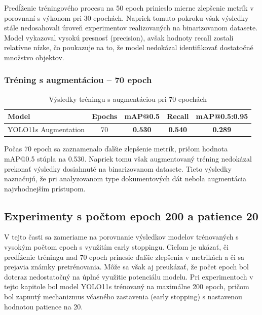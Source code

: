             Predĺženie tréningového procesu na 50 epoch prinieslo mierne zlepšenie metrík v porovnaní s výkonom pri 30 epochách. Napriek tomuto pokroku však výsledky stále nedosahovali úroveň experimentov realizovaných na binarizovanom datasete. Model vykazoval vysokú presnosť (precision), avšak hodnoty recall zostali relatívne nízke, čo poukazuje na to, že model nedokázal identifikovať dostatočné množstvo objektov.

            \subsubsection{Tréning s augmentáciou – 70 epoch}

            \begin{table}[H]
                \centering
                \begin{tabular}{|l|c|c|c|c|}
                \hline
                \textbf{Model} & \textbf{Epochs} & \textbf{mAP@0.5} & \textbf{Recall} & \textbf{mAP@0.5:0.95} \\ \hline
                YOLO11s Augmentation & 70 & \textbf{0.530} & \textbf{0.540} & \textbf{0.289} \\ \hline
                \end{tabular}
                \caption{Výsledky tréningu s augmentáciou pri 70 epochách}
                \label{tab:aug70}
            \end{table}

            Počas 70 epoch sa zaznamenalo ďalšie zlepšenie metrík, pričom hodnota mAP@0.5 stúpla na 0.530. Napriek tomu však augmentovaný tréning nedokázal prekonať výsledky dosiahnuté na binarizovanom datasete. Tieto výsledky naznačujú, že pri analyzovanom type dokumentových dát nebola augmentácia najvhodnejším prístupom.

            \subsection{Experimenty s počtom epoch 200 a patience 20}

            V tejto časti sa zameriame na porovnanie výsledkov modelov trénovaných s vysokým počtom epoch s využitím early stoppingu. Cieľom je ukázať, či predĺženie tréningu nad 70 epoch prinesie ďalšie zlepšenia v metrikách a či sa prejavia známky pretrénovania. Môže sa však aj preukázať, že počet epoch bol doteraz nedostatočný na úplné využitie potenciálu modelu.
            Pri experimentoch v tejto kapitole bol model YOLO11s trénovaný na maximálne 200 epoch, pričom bol zapnutý mechanizmus včasného zastavenia (early stopping) s nastavenou hodnotou patience na 20.

